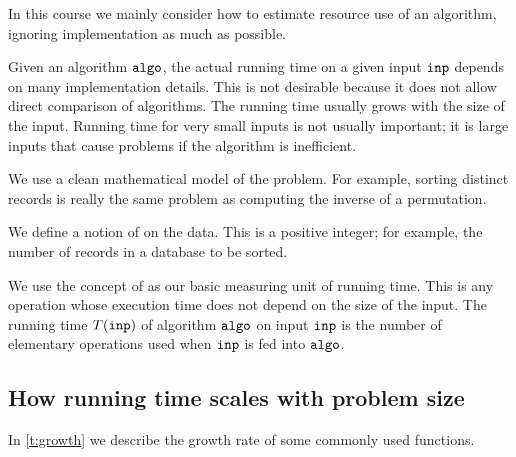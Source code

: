 In this course we mainly consider how to estimate resource use of an algorithm, 
ignoring implementation as much as possible.  

Given an algorithm $\operatorname{\text{\texttt{algo}}}$, the actual running time on a given
input $\operatorname{\text{\texttt{inp}}}$ depends on many implementation details. This is not desirable
because it does not allow direct comparison of algorithms. 
The running time usually grows with the size of the input.
Running time for very small inputs is not usually important; it is large
inputs that cause problems if the algorithm is inefficient. 

We use a clean mathematical model of the problem. 
For example, sorting distinct records is really the same problem as computing the inverse of a permutation. 

\begin{Definition}
We define a notion of  on the data. 
This is a positive integer; for example, the number of records in a database to be sorted.

We use the concept of  as our basic measuring unit of running time. 
This is any operation whose execution time does not depend on the size of the input.
The running time $T(\operatorname{\text{\texttt{inp}}})$ of algorithm $\operatorname{\text{\texttt{algo}}}$ on input $\operatorname{\text{\texttt{inp}}}$ is the 
number of elementary operations used when $\operatorname{\text{\texttt{inp}}}$ is fed into $\operatorname{\text{\texttt{algo}}}$.
\end{Definition}


\subsection{How running time scales with problem size}
In \cref{t:growth} we describe the growth rate of some commonly used functions.

